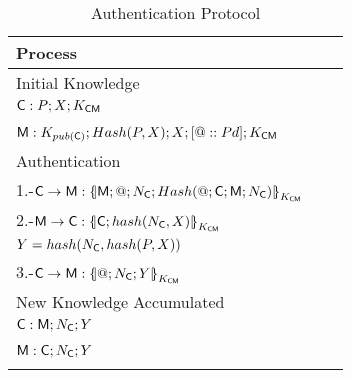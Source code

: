 \begin{table}[htb]
\footnotesize
\begin{center}
\caption{Authentication Protocol}
\label{table:AuthProtocol}
\begin{tabular}{|l|l|l|}
\hline
{\bf Process}                                                                     \\\hline\hline
            Initial Knowledge                                                     \\
            $\textsf{C}:P; X ; K_{\textsf{C}\textsf{M}}$                               \\
            \hspace{5mm}                                                 \\ 
            $\textsf{M}: K_{pub(\textsf{C})}; Hash(P,X); X ;[@::Pd] ; K_{\textsf{C}\textsf{M}}$ \\\hline \hline
            Authentication                                                         \\
            1.-$\Client\rightarrow \Server: \fat{\Server \lnk @ \lnk N_{\Client} \lnk 
                                              Hash(@\lnk \Client \lnk \Server \lnk N_\Client)}_{K_{\Client\Server}}$  \\ 
            2.-$\Server\rightarrow \Client: \fat{\Client \lnk hash(N_{\Client},X)}_{K_{\Client\Server}}$ \\ 
            \hspace{5mm} $Y=hash(N_{\textsf{C}},hash(P,X))$                          \\              
            3.-$\Client\rightarrow \Server: \fat{@\lnk N_{\Client}\lnk Y}_{K_{\Client\Server}}$            \\ \hline  \hline
            New Knowledge Accumulated                                               \\
            $\textsf{C}: \textsf{M} ; N_{\textsf{C}} ; Y$         \\
            \hspace{5mm}                \\ 
            $\textsf{M}: \textsf{C}  ; N_{\textsf{C}} ; Y$          \\ 
            \hspace{5mm}                             \\ \hline \hline
\end{tabular}
\end{center}
\end{table}
\normalsize

